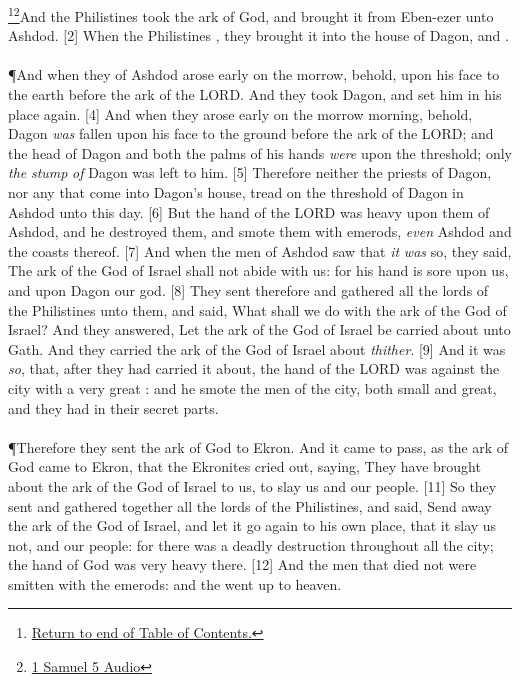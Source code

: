 \footnote{\textcolor[cmyk]{0.99998,1,0,0}{\hyperlink{TOC}{Return to end of Table of Contents.}}}\footnote{\href{https://audiobible.com/bible/1_samuel_5.html}{\textcolor[cmyk]{0.99998,1,0,0}{1 Samuel 5 Audio}}}\textcolor[cmyk]{0.99998,1,0,0}{And the Philistines took the ark of God, and brought it from Eben-ezer unto Ashdod.}
[2] \textcolor[cmyk]{0.99998,1,0,0}{When the Philistines , they brought it into the house of Dagon, and .}\\
\\
\P \textcolor[cmyk]{0.99998,1,0,0}{And when they of Ashdod arose early on the morrow, behold,   upon his face to the earth before the ark of the LORD. And they took Dagon, and set him in his place again.}
[4] \textcolor[cmyk]{0.99998,1,0,0}{And when they arose early on the morrow morning, behold, Dagon \emph{was} fallen upon his face to the ground before the ark of the LORD; and the head of Dagon and both the palms of his hands \emph{were}  upon the threshold; only \emph{the} \emph{stump} \emph{of} Dagon was left to him.}
[5] \textcolor[cmyk]{0.99998,1,0,0}{Therefore neither the priests of Dagon, nor any that come into Dagon's house, tread on the threshold of Dagon in Ashdod unto this day.}
[6] \textcolor[cmyk]{0.99998,1,0,0}{But the hand of the LORD was heavy upon them of Ashdod, and he destroyed them, and smote them with emerods, \emph{even} Ashdod and the coasts thereof.}
[7] \textcolor[cmyk]{0.99998,1,0,0}{And when the men of Ashdod saw that \emph{it} \emph{was} so, they said, The ark of the God of Israel shall not abide with us: for his hand is sore upon us, and upon Dagon our god.}
[8] \textcolor[cmyk]{0.99998,1,0,0}{They sent therefore and gathered all the lords of the Philistines unto them, and said, What shall we do with the ark of the God of Israel? And they answered, Let the ark of the God of Israel be carried about unto Gath. And they carried the ark of the God of Israel about \emph{thither}.}
[9] \textcolor[cmyk]{0.99998,1,0,0}{And it was \emph{so}, that, after they had carried it about, the hand of the LORD was against the city with a very great : and he smote the men of the city, both small and great, and they had  in their secret parts.}\\
\\
\P \textcolor[cmyk]{0.99998,1,0,0}{Therefore they sent the ark of God to Ekron. And it came to pass, as the ark of God came to Ekron, that the Ekronites cried out, saying, They have brought about the ark of the God of Israel to us, to slay us and our people.}
[11] \textcolor[cmyk]{0.99998,1,0,0}{So they sent and gathered together all the lords of the Philistines, and said, Send away the ark of the God of Israel, and let it go again to his own place, that it slay us not, and our people: for there was a deadly destruction throughout all the city; the hand of God was very heavy there.}
[12] \textcolor[cmyk]{0.99998,1,0,0}{And the men that died not were smitten with the emerods: and the  went up to heaven.}